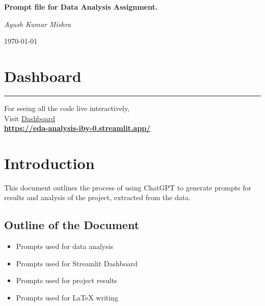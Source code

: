 \documentclass[11pt,a4paper]{article}
\begin{document}
\begin{titlepage}
\centering
{\Huge\bfseries Prompt file for Data Analysis Assignment.\par}
\vspace{2cm}
{\Huge\itshape Ayush Kumar Mishra\par}
\vfill
{\large \today\par}
\end{titlepage}

\newpage
\section*{Dashboard}
  \begin{center}
        \color{red}\rule{1\linewidth}{1mm}
    \end{center}
\begin{center}
\vspace{2in}
    {\Huge  For seeing all the code live interactively, \\
    \vspace{2in}
    Visit  \href{https://eda-analysis-iby-0.streamlit.app/}{Dashboard}}\\
    
    \vspace{0.7in}
   \textbf{ \href{https://eda-analysis-iby-0.streamlit.app/}{https://eda-analysis-iby-0.streamlit.app/}}
\end{center}

\newpage

\tableofcontents

\newpage

\section{Introduction}
\label{sec:intro}
This document outlines the process of using ChatGPT to generate prompts for results and analysis of the project, extracted from the data.

\subsection{Outline of the Document}
\begin{itemize}[leftmargin=*]
    \item Prompts used for data analysis
    \item Prompts used for Streamlit Dashboard
    \item Prompts used for project results
    \item Prompts used for LaTeX writing
\end{itemize}
\end{document}
